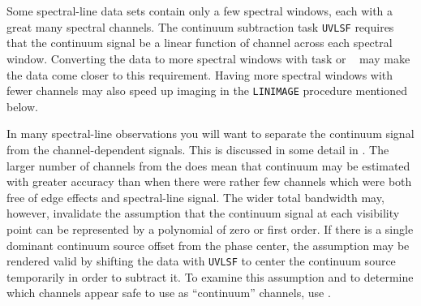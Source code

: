 
Some spectral-line data sets contain only a few spectral windows, each
with a great many spectral channels.  The continuum subtraction
task {\tt UVLSF} requires that the continuum signal be a linear
function of channel across each spectral window.  Converting the data
to more spectral windows with task {\tt {}} or  {\tt
{}} may make the data come closer to this requirement.
Having more spectral windows with fewer channels may also speed up
imaging in the {\tt LINIMAGE} procedure mentioned below.

In many spectral-line observations you will want to separate the
continuum signal from the channel-dependent signals.  This is
discussed in some detail in .  The larger number of
channels from the  does mean that continuum may be
estimated with greater accuracy than when there were rather few
channels which were both free of edge effects and spectral-line
signal.  The wider total bandwidth may, however, invalidate the
assumption that the continuum signal at each visibility point can be
represented by a polynomial of zero or first order.  If there is a
single dominant continuum source offset from the phase center, the
assumption may be rendered valid by shifting the data with {\tt UVLSF}
to center the continuum source temporarily in order to subtract it.
To examine this assumption and to determine which channels appear safe
to use as ``continuum'' channels, use {\tt {}}\@.
